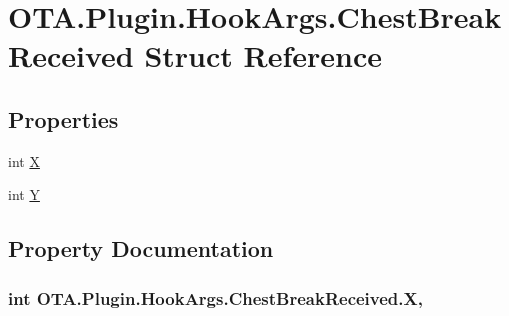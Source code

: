 \hypertarget{struct_o_t_a_1_1_plugin_1_1_hook_args_1_1_chest_break_received}{}\section{O\+T\+A.\+Plugin.\+Hook\+Args.\+Chest\+Break\+Received Struct Reference}
\label{struct_o_t_a_1_1_plugin_1_1_hook_args_1_1_chest_break_received}
\subsection*{Properties}
\begin{DoxyCompactItemize}
\item 
int \hyperlink{struct_o_t_a_1_1_plugin_1_1_hook_args_1_1_chest_break_received_a72adef0344779a9ebad8b66784c293c3}{X}
\item 
int \hyperlink{struct_o_t_a_1_1_plugin_1_1_hook_args_1_1_chest_break_received_acfb63d84c31c9f149216918a82317ebb}{Y}
\end{DoxyCompactItemize}


\subsection{Property Documentation}
\hypertarget{struct_o_t_a_1_1_plugin_1_1_hook_args_1_1_chest_break_received_a72adef0344779a9ebad8b66784c293c3}{}
\subsubsection[{X}]{\setlength{\rightskip}{0pt plus 5cm}int O\+T\+A.\+Plugin.\+Hook\+Args.\+Chest\+Break\+Received.\+X\hspace{0.3cm}{\ttfamily [get]}, {\ttfamily [set]}}\label{struct_o_t_a_1_1_plugin_1_1_hook_args_1_1_chest_break_received_a72adef0344779a9ebad8b66784c293c3}
\hypertarget{struct_o_t_a_1_1_plugin_1_1_hook_args_1_1_chest_break_received_acfb63d84c31c9f149216918a82317ebb}{}
